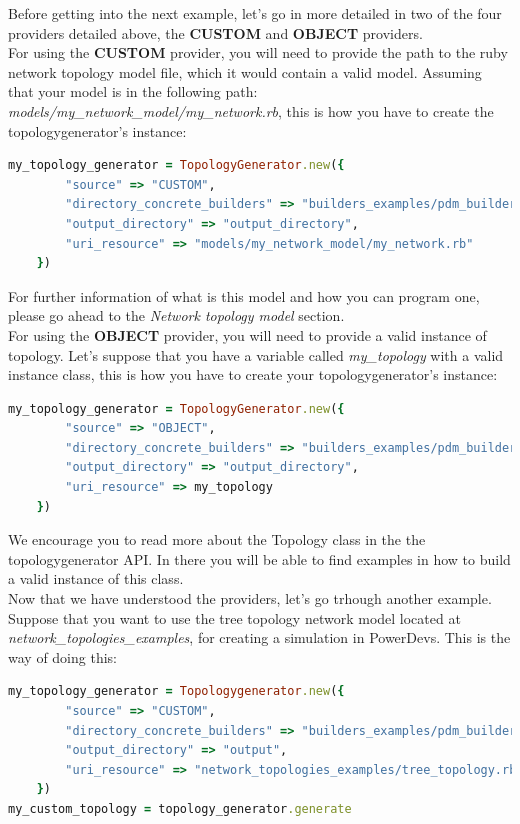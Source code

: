 Before getting into the next example, let's go in more detailed in two of the four providers detailed above, the \textbf{CUSTOM} and \textbf{OBJECT} providers.\\
For using the \textbf{CUSTOM} provider, you will need to provide the path to the ruby network topology model file, which it would contain a valid model. Assuming that your model is in the following path: \textit{models/my\_network\_model/my\_network.rb}, this is how you have to create the topologygenerator's instance:

\begin{lstlisting}[language=Ruby]
my_topology_generator = TopologyGenerator.new({
        "source" => "CUSTOM",
        "directory_concrete_builders" => "builders_examples/pdm_builders",
        "output_directory" => "output_directory",
        "uri_resource" => "models/my_network_model/my_network.rb"
    })
\end{lstlisting}

For further information of what is this model and how you can program one, please go ahead to the \textit{Network topology model} section.\\

For using the \textbf{OBJECT} provider, you will need to provide a valid instance of topology. Let's suppose that you have a variable called \textit{my\_topology} with a valid instance class, this is how you have to create your topologygenerator's instance:

\begin{lstlisting}[language=Ruby]
my_topology_generator = TopologyGenerator.new({
        "source" => "OBJECT",
        "directory_concrete_builders" => "builders_examples/pdm_builders",
        "output_directory" => "output_directory",
        "uri_resource" => my_topology
    })
\end{lstlisting}

We encourage you to read more about the Topology class in the the topologygenerator API. In there you will be able to find examples in how to build a valid instance of this class.\\

Now that we have understood the providers, let's go trhough another example. Suppose that you want to use the tree topology network model located at \textit{network\_topologies\_examples}, for creating a simulation in PowerDevs. This is the way of doing this:

\begin{lstlisting}[language=Ruby]
my_topology_generator = Topologygenerator.new({
        "source" => "CUSTOM",
        "directory_concrete_builders" => "builders_examples/pdm_builders",
        "output_directory" => "output",
        "uri_resource" => "network_topologies_examples/tree_topology.rb" 
    })
my_custom_topology = topology_generator.generate
\end{lstlisting}


